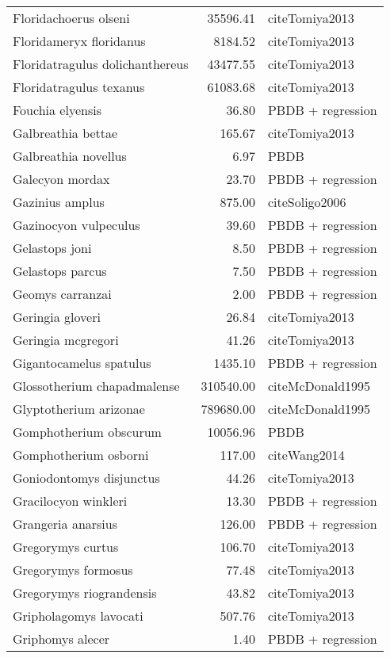 \begin{table}[ht]
\begin{tabular}{lrl}
  Floridachoerus olseni & 35596.41 & cite{Tomiya2013} \\ 
  Floridameryx floridanus & 8184.52 & cite{Tomiya2013} \\ 
  Floridatragulus dolichanthereus & 43477.55 & cite{Tomiya2013} \\ 
  Floridatragulus texanus & 61083.68 & cite{Tomiya2013} \\ 
  Fouchia elyensis & 36.80 & PBDB + regression \\ 
  Galbreathia bettae & 165.67 & cite{Tomiya2013} \\ 
  Galbreathia novellus & 6.97 & PBDB \\ 
  Galecyon mordax & 23.70 & PBDB + regression \\ 
  Gazinius amplus & 875.00 & cite{Soligo2006} \\ 
  Gazinocyon vulpeculus & 39.60 & PBDB + regression \\ 
  Gelastops joni & 8.50 & PBDB + regression \\ 
  Gelastops parcus & 7.50 & PBDB + regression \\ 
  Geomys carranzai & 2.00 & PBDB + regression \\ 
  Geringia gloveri & 26.84 & cite{Tomiya2013} \\ 
  Geringia mcgregori & 41.26 & cite{Tomiya2013} \\ 
  Gigantocamelus spatulus & 1435.10 & PBDB + regression \\ 
  Glossotherium chapadmalense & 310540.00 & cite{McDonald1995} \\ 
  Glyptotherium arizonae & 789680.00 & cite{McDonald1995} \\ 
  Gomphotherium obscurum & 10056.96 & PBDB \\ 
  Gomphotherium osborni & 117.00 & cite{Wang2014} \\ 
  Goniodontomys disjunctus & 44.26 & cite{Tomiya2013} \\ 
  Gracilocyon winkleri & 13.30 & PBDB + regression \\ 
  Grangeria anarsius & 126.00 & PBDB + regression \\ 
  Gregorymys curtus & 106.70 & cite{Tomiya2013} \\ 
  Gregorymys formosus & 77.48 & cite{Tomiya2013} \\ 
  Gregorymys riograndensis & 43.82 & cite{Tomiya2013} \\ 
  Gripholagomys lavocati & 507.76 & cite{Tomiya2013} \\ 
  Griphomys alecer & 1.40 & PBDB + regression \\ 

\end{tabular}
\end{table}

